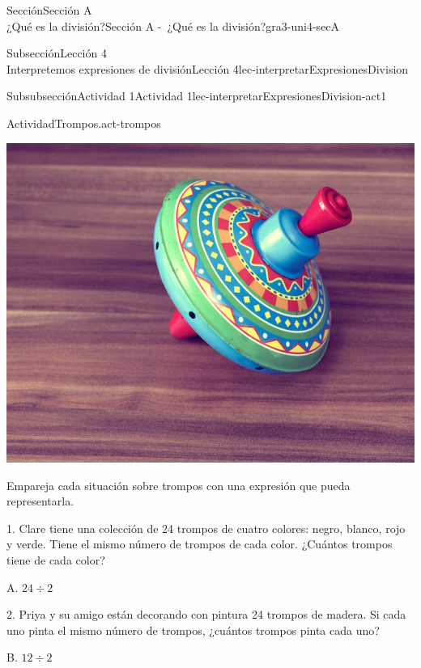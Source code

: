 \begin{sectionptx}{Sección}{{\Large Sección A\\}¿Qué es la división?}{}{Sección A -~¿Qué es la división?}{}{}{gra3-uni4-secA}
\begin{subsectionptx}{Subsección}{{\normalsize Lección 4\\[-0.05cm]}Interpretemos expresiones de división}{}{Lección 4}{}{}{lec-interpretarExpresionesDivision}
\begin{subsubsectionptx}{Subsubsección}{Actividad 1}{}{Actividad 1}{}{}{lec-interpretarExpresionesDivision-act1}
\begin{activity}{Actividad}{Trompos.}{act-trompos}
\begin{sidebyside}{5}{0}{0}{0}
\begin{sbspanel}{0.2}
\includegraphics[max width=\linewidth, center]{external/jpg-source/V1 3.4.A.4 Colorful Top.jpg}
\end{sbspanel}%
\end{sidebyside}%
\par
Empareja cada situación sobre trompos con una expresión que pueda representarla.%
\clearpage
\begin{sidebyside}{2}{0.05}{0}{0.15}%
\begin{sbspanel}{0.6}%
1. Clare tiene una colección de 24 trompos de cuatro colores: negro, blanco, rojo y verde. Tiene el mismo número de trompos de cada color. ¿Cuántos trompos tiene de cada color?%
\end{sbspanel}%
\begin{sbspanel}{0.2}%
\par
A. \(24 \div 2\)%
\end{sbspanel}%
\end{sidebyside}%
\begin{sidebyside}{2}{0.05}{0}{0.15}%
\begin{sbspanel}{0.6}%
2. Priya y su amigo están decorando con pintura 24 trompos de madera. Si cada uno pinta el mismo número de trompos, ¿cuántos trompos pinta cada uno?%
\end{sbspanel}%
\begin{sbspanel}{0.2}%
\par
B. \(12 \div 2\)%
\end{sbspanel}%
\end{sidebyside}%
\begin{sidebyside}{2}{0.05}{0}{0.15}%
\begin{sbspanel}{0.6}%

\end{sbspanel}
\end{sidebyside}
\end{activity}
\end{subsubsectionptx}
\end{subsectionptx}
\end{sectionptx}
